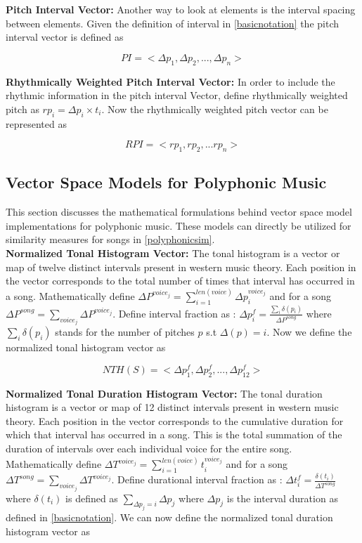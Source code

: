 \noindent \textbf{Pitch Interval Vector:} Another way to look at elements is the interval spacing between elements. Given the definition of interval in \ref{basicnotation} the pitch interval vector is defined as 

\begin{equation}
PI = <\Delta p_1, \Delta p_2, ... , \Delta p_n>
\end{equation}

\noindent \textbf{Rhythmically Weighted Pitch Interval Vector:} In order to include the rhythmic information in the pitch interval Vector, define rhythmically weighted pitch as $rp_i = \Delta p_i \times t_i$. Now the rhythmically weighted pitch vector can be represented as

\begin{equation}
RPI = <rp_1, rp_2, ... rp_n>
\end{equation}

\subsection{Vector Space Models for Polyphonic Music} \label{polyphonicvectors}

\noindent This section discusses the mathematical formulations behind vector space model implementations for polyphonic music. These models can directly be utilized for similarity measures for songs in \ref{polyphonicsim}. \\

\noindent \textbf{Normalized Tonal Histogram Vector:} The tonal histogram is a vector or map of twelve distinct intervals present in western music theory. Each position in the vector corresponds to the total number of times that interval has occurred in a song. Mathematically define $\Delta P^{voice_j} = \sum_{i=1}^{len(voice)} \Delta p_i^{voice_j}$ and for a song $\Delta P^{song} = \sum_{voice_j} \Delta P^{voice_j}$. Define interval fraction as : $\Delta p^f_i = \frac{\sum_i \delta (p_i)}{\Delta P^{song}}$ where $\sum_i \delta (p_i)$ stands for the number of pitches $p$ s.t $\Delta(p) = i$. Now we define the normalized tonal histogram vector as
 
\begin{equation} \label{eq:nth}
NTH(S) = <\Delta p^f_1, \Delta p^f_2, ... , \Delta p^f_{12}>
\end{equation}

\noindent \textbf{Normalized Tonal Duration Histogram Vector:} The tonal duration histogram is a vector or map of 12 distinct intervals present in western music theory. Each position in the vector corresponds to the cumulative duration for which that interval has occurred in a song. This is the total summation of the duration of intervals over each individual voice for the entire song. Mathematically define $\Delta T^{voice_j} = \sum_{i=1}^{len(voice)} t_i^{voice_j}$ and for a song $\Delta T^{song} = \sum_{voice_j} \Delta T^{voice_j}$. Define durational interval fraction as : $\Delta t^f_i = \frac{\delta (t_i)}{\Delta T^{song}}$ where $\delta (t_i)$ is defined as $\sum_{\Delta p_j = i} \Delta p_j $ where $\Delta p_j$ is the interval duration as defined in \ref{basicnotation}. We can now define the normalized tonal duration histogram vector as

